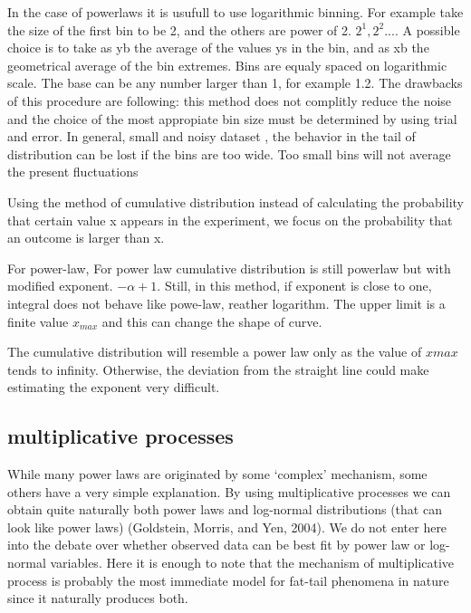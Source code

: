 In the case of powerlaws it is usufull to use logarithmic binning. For example take the size of the first bin to be 2, and the others are power of 2. $2^1, 2^2...$. A possible choice is to take as yb the average of the values ys in the bin, and as xb the geometrical average of the bin extremes. Bins are equaly spaced on logarithmic scale. The base can be any number larger than 1, for example 1.2. The drawbacks of this procedure are following: this method does not complitly reduce the noise and the choice of the most appropiate bin size must be determined by using trial and error. In general, small and noisy dataset , the behavior in the tail of distribution can be lost if the bins are too wide. Too small bins will not average the present fluctuations

Using the method of cumulative distribution instead of calculating the probability that certain value x appears in the experiment, we focus on the probability that an outcome is larger than x. 

For power-law, 
 For power law cumulative distribution is still powerlaw but with modified exponent. $-\alpha+1$. Still, in this method, if exponent is close to one, integral does not behave like powe-law, reather logarithm. The upper limit is a finite value $x_{max}$ and this can change the shape of curve. 

The cumulative distribution will resemble a power law only as the value of $xmax$ tends to infinity. Otherwise, the deviation from the straight line could make estimating the exponent very difficult.

\subsection{multiplicative processes}

While many power laws are originated by some ‘complex’ mechanism, some
others have a very simple explanation. By using multiplicative processes we
can obtain quite naturally both power laws and log-normal distributions
(that can look like power laws) (Goldstein, Morris, and Yen, 2004). We
do not enter here into the debate over whether observed data can be best
ﬁt by power law or log-normal variables. Here it is enough to note that
the mechanism of multiplicative process is probably the most immediate
model for fat-tail phenomena in nature since it naturally produces both.

